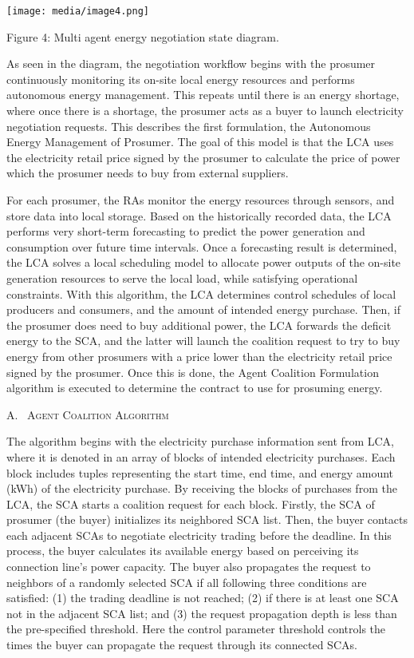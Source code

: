 \documentclass[
]{article}
\begin{document}
\texttt{[image: media/image4.png]}

Figure 4: Multi agent energy negotiation state diagram.

As seen in the diagram, the negotiation workflow begins with the
prosumer continuously monitoring its on-site local energy resources and
performs autonomous energy management. This repeats until there is an
energy shortage, where once there is a shortage, the prosumer acts as a
buyer to launch electricity negotiation requests. This describes the
first formulation, the Autonomous Energy Management of Prosumer. The
goal of this model is that the LCA uses the electricity retail price
signed by the prosumer to calculate the price of power which the
prosumer needs to buy from external suppliers.

For each prosumer, the RAs monitor the energy resources through sensors,
and store data into local storage. Based on the historically recorded
data, the LCA performs very short-term forecasting to predict the power
generation and consumption over future time intervals. Once a
forecasting result is determined, the LCA solves a local scheduling
model to allocate power outputs of the on-site generation resources to
serve the local load, while satisfying operational constraints. With
this algorithm, the LCA determines control schedules of local producers
and consumers, and the amount of intended energy purchase. Then, if the
prosumer does need to buy additional power, the LCA forwards the deficit
energy to the SCA, and the latter will launch the coalition request to
try to buy energy from other prosumers with a price lower than the
electricity retail price signed by the prosumer. Once this is done, the
Agent Coalition Formulation algorithm is executed to determine the
contract to use for prosuming energy.

A.~ \textsc{Agent Coalition Algorithm}

The algorithm begins with the electricity purchase information sent from
LCA, where it is denoted in an array of blocks of intended electricity
purchases. Each block includes tuples representing the start time, end
time, and energy amount (kWh) of the electricity purchase. By receiving
the blocks of purchases from the LCA, the SCA starts a coalition request
for each block. Firstly, the SCA of prosumer (the buyer) initializes its
neighbored SCA list. Then, the buyer contacts each adjacent SCAs to
negotiate electricity trading before the deadline. In this process, the
buyer calculates its available energy based on perceiving its connection
line's power capacity. The buyer also propagates the request to
neighbors of a randomly selected SCA if all following three conditions
are satisfied: (1) the trading deadline is not reached; (2) if there is
at least one SCA not in the adjacent SCA list; and (3) the request
propagation depth is less than the pre-specified threshold. Here the
control parameter threshold controls the times the buyer can propagate
the request through its connected SCAs.
\end{document}
